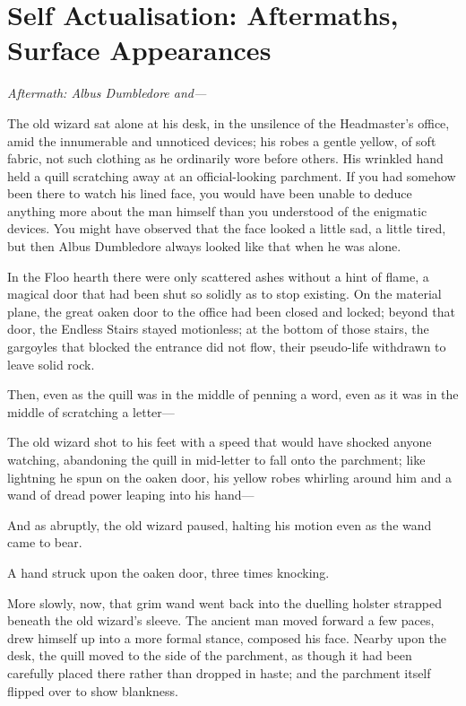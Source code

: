 \chapter{Self Actualisation: Aftermaths, Surface
Appearances}\label{self-actualisation-aftermaths-surface-appearances}

\emph{Aftermath: Albus Dumbledore and---}

The old wizard sat alone at his desk, in the unsilence of the
Headmaster's office, amid the innumerable and unnoticed devices; his
robes a gentle yellow, of soft fabric, not such clothing as he
ordinarily wore before others. His wrinkled hand held a quill scratching
away at an official-looking parchment. If you had somehow been there to
watch his lined face, you would have been unable to deduce anything more
about the man himself than you understood of the enigmatic devices. You
might have observed that the face looked a little sad, a little tired,
but then Albus Dumbledore always looked like that when he was alone.

In the Floo hearth there were only scattered ashes without a hint of
flame, a magical door that had been shut so solidly as to stop existing.
On the material plane, the great oaken door to the office had been
closed and locked; beyond that door, the Endless Stairs stayed
motionless; at the bottom of those stairs, the gargoyles that blocked
the entrance did not flow, their pseudo-life withdrawn to leave solid
rock.

Then, even as the quill was in the middle of penning a word, even as it
was in the middle of scratching a letter---

The old wizard shot to his feet with a speed that would have shocked
anyone watching, abandoning the quill in mid-letter to fall onto the
parchment; like lightning he spun on the oaken door, his yellow robes
whirling around him and a wand of dread power leaping into his hand---

And as abruptly, the old wizard paused, halting his motion even as the
wand came to bear.

A hand struck upon the oaken door, three times knocking.

More slowly, now, that grim wand went back into the duelling holster
strapped beneath the old wizard's sleeve. The ancient man moved forward
a few paces, drew himself up into a more formal stance, composed his
face. Nearby upon the desk, the quill moved to the side of the
parchment, as though it had been carefully placed there rather than
dropped in haste; and the parchment itself flipped over to show
blankness.


